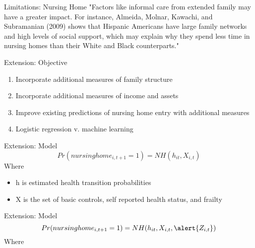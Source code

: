 \documentclass[10pt]{beamer}
\begin{document}
\begin{frame}{Limitations: Nursing Home}
    "Factors like informal care from extended family may
have a greater impact. For instance, Almeida, Molnar, Kawachi, and Subramanian (2009)
shows that Hispanic Americans have large family networks and high levels of social support,
which may explain why they spend less time in nursing homes than their White and Black
counterparts."
\end{frame}

\begin{frame}{Extension: Objective}
    \begin{enumerate}
        \item Incorporate additional measures of family structure \\
        \item Incorporate additional measures of income and assets \\
        \item Improve existing predictions of nursing home entry with additional measures \\
        \item Logistic regression v. machine learning
    \end{enumerate}
\end{frame}

\begin{frame}{Extension: Model}
    \[Pr(nursinghome_{i,t+1}=1)=NH(h_{it},X_{i,t})\]
    Where
    \begin{itemize}
        \item h is estimated health transition probabilities \\
        \item X is the set of basic controls, self reported health status, and frailty
    \end{itemize}
\end{frame}

\begin{frame}{Extension: Model}
    \[Pr(nursinghome_{i,t+1}=1)=NH(h_{it},X_{i,t}, \alert{Z_{i,t}})\]
    Where
\end{frame}
\end{document}
